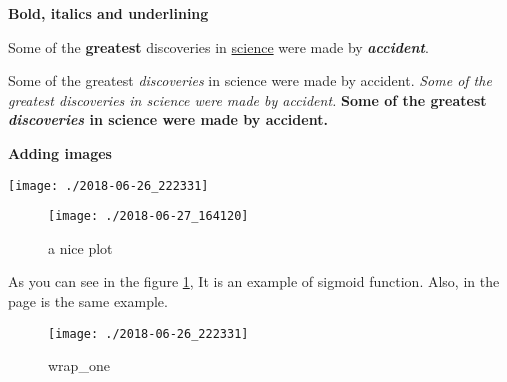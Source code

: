 \documentclass[12pt, letterpaper]{article}
\begin{document}
\textbf{Bold, italics and underlining}

Some of the \textbf{greatest} discoveries in \underline{science} were made by \textbf{\textit{accident}}.

Some of the greatest \emph{discoveries} in science were made by accident.
\textit{Some of the greatest \emph{discoveries} in science were made by accident.}
\textbf{Some of the greatest \emph{discoveries} in science were made by accident.}

\textbf{Adding images}

\begin{center}
	\begin{comment}
		\texttt{[image: lion-logo]}	%
		\texttt{[image: lion-logo]}	%
		\texttt{[image: universe]}	%
		\texttt{[image: lion-logo]}	%
	\end{comment}
	\texttt{[image: ./2018-06-26\_222331]}	%
	\begin{figure}[h]	%
		\centering
		\texttt{[image: ./2018-06-27\_164120]}
		\caption{a nice plot}	%
		\label{fig:plot}	%
	\end{figure}
\end{center}

As you can see in the figure \ref{fig:plot}, It is an example of sigmoid function. Also, in the page \pageref{fig:plot} is the same example.

\begin{wrapfigure}{r}{0.25\textwidth}	%
	\centering
	\texttt{[image: ./2018-06-26\_222331]}
	\caption{wrap\_one}
\end{wrapfigure}
\end{document}

